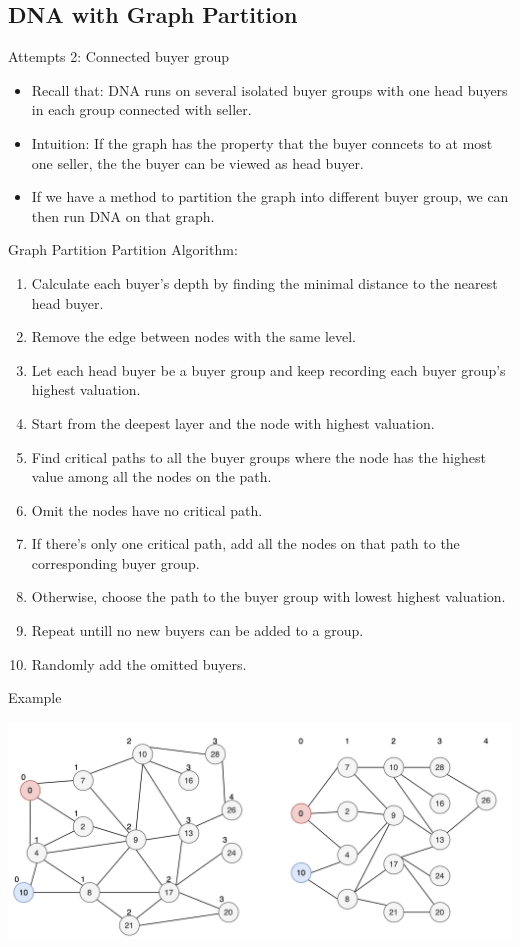 \documentclass{beamer}
\begin{document}
\subsection{DNA with Graph Partition}
\begin{frame}{Attempts 2: Connected buyer group}
	\begin{itemize}
		\item Recall that: DNA runs on several isolated buyer groups with one head buyers in each group connected with seller.
		\item Intuition: If the graph has the property that the buyer conncets to at most one seller, the the buyer can be viewed as head buyer.
		\item If we have a method to partition the graph into different buyer group, we can then run DNA on that graph.
	\end{itemize}
\end{frame}
\begin{frame}{Graph Partition}
	Partition Algorithm:
	\begin{enumerate}
		\item Calculate each buyer's depth by finding the minimal distance to the nearest head buyer.
		\item Remove the edge between nodes with the same level.
		\item Let each head buyer be a buyer group and keep recording each buyer group's highest valuation.
		\item Start from the deepest layer and the node with highest valuation.
		\item Find critical paths to all the buyer groups where the node has the highest value among all the nodes on the path.
		\item Omit the nodes have no critical path.
		\item If there's only one critical path, add all the nodes on that path to the corresponding buyer group.
		\item Otherwise, choose the path to the buyer group with lowest highest valuation.
		\item  Repeat untill no new buyers can be added to a group.
		\item Randomly add the omitted buyers.
	\end{enumerate}
\end{frame}
\begin{frame}{Example}
	\begin{center}
		\includegraphics[width=\textwidth]{Graph01}
	\end{center}
\end{frame}
\end{document}
